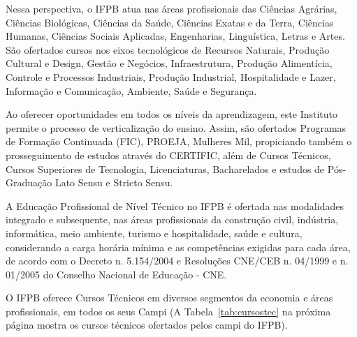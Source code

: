 	Nessa perspectiva, o IFPB atua nas áreas profissionais das Ciências Agrárias, Ciências Biológicas, Ciências da Saúde, Ciências Exatas e da Terra, Ciências Humanas, Ciências Sociais Aplicadas, Engenharias, Linguística, Letras e Artes. São ofertados cursos nos eixos tecnológicos de Recursos Naturais, Produção Cultural e Design, Gestão e Negócios, Infraestrutura, Produção Alimentícia, Controle e Processos Industriais, Produção Industrial, Hospitalidade e Lazer, Informação e Comunicação, Ambiente, Saúde e Segurança.

	Ao oferecer oportunidades em todos os níveis da aprendizagem, este Instituto permite o processo de verticalização do ensino. Assim, são ofertados Programas de Formação Continuada (FIC), PROEJA, Mulheres Mil, propiciando também o prosseguimento de estudos através do CERTIFIC, além de Cursos Técnicos, Cursos Superiores de Tecnologia, Licenciaturas, Bacharelados e estudos de Pós-Graduação Lato Sensu e Stricto Sensu.
	
	A Educação Profissional de Nível Técnico no IFPB é ofertada nas modalidades integrado e subsequente, nas áreas profissionais da construção civil, indústria, informática, meio ambiente, turismo e hospitalidade, saúde e cultura, considerando a carga horária mínima e as competências exigidas para cada área, de acordo com o Decreto n. 5.154/2004 e Resoluções CNE/CEB n. 04/1999 e n. 01/2005 do Conselho Nacional de Educação - CNE. 
	
	O IFPB oferece Cursos Técnicos em diversos segmentos da economia e áreas profissionais, em todos os seus Campi (A Tabela~\ref{tab:cursostec} na próxima página mostra os cursos técnicos ofertados pelos campi do IFPB).
	
